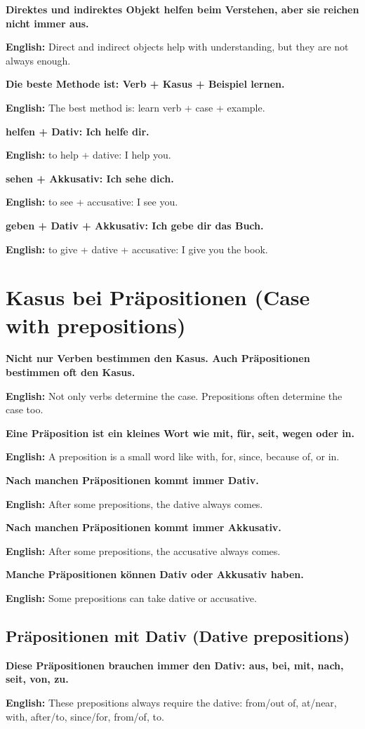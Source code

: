 \documentclass[a4paper,11pt]{article}
\newcommand{\EnglishText}[1]{{\small\color{SoftGray}\textbf{English: }#1\par}}
\newcommand{\EN}[1]{\EnglishText{#1}}
\begin{document}
            \textbf{Direktes und indirektes Objekt helfen beim Verstehen, aber sie reichen nicht immer aus.}
            \EN{Direct and indirect objects help with understanding, but they are not always enough.}
            
            \textbf{Die beste Methode ist: Verb + Kasus + Beispiel lernen.}
            \EN{The best method is: learn verb + case + example.}
            
            \textbf{helfen + Dativ: Ich helfe dir.}
            \EN{to help + dative: I help you.}
            
            \textbf{sehen + Akkusativ: Ich sehe dich.}
            \EN{to see + accusative: I see you.}
            
            \textbf{geben + Dativ + Akkusativ: Ich gebe dir das Buch.}
            \EN{to give + dative + accusative: I give you the book.}
    
    
    \section{Kasus bei Präpositionen \textnormal{(Case with prepositions)}}
        
        \textbf{Nicht nur Verben bestimmen den Kasus. Auch Präpositionen bestimmen oft den Kasus.}
        \EN{Not only verbs determine the case. Prepositions often determine the case too.}
        
        \textbf{Eine Präposition ist ein kleines Wort wie mit, für, seit, wegen oder in.}
        \EN{A preposition is a small word like with, for, since, because of, or in.}
        
        \textbf{Nach manchen Präpositionen kommt immer Dativ.}
        \EN{After some prepositions, the dative always comes.}
        
        \textbf{Nach manchen Präpositionen kommt immer Akkusativ.}
        \EN{After some prepositions, the accusative always comes.}
        
        \textbf{Manche Präpositionen können Dativ oder Akkusativ haben.}
        \EN{Some prepositions can take dative or accusative.}
        
        \subsection{Präpositionen mit Dativ \textnormal{(Dative prepositions)}}
            
            \textbf{Diese Präpositionen brauchen immer den Dativ: aus, bei, mit, nach, seit, von, zu.}
            \EN{These prepositions always require the dative: from/out of, at/near, with, after/to, since/for, from/of, to.}
            
\end{document}
